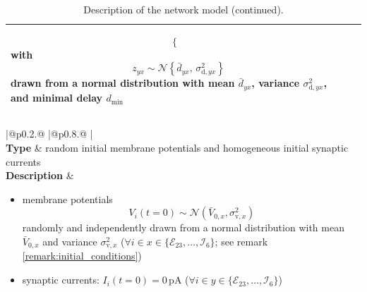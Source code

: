 \documentclass[10pt,a4paper,twoside,american]{article}
\theoremstyle{definitionstyle}
\begin{document}
\begin{table}[H]
\begin{tabular}{
  |@{\hspace*{\marg}}p{}@{\hspace*{\marg}}
  |@{\hspace*{\marg}}p{}@{\hspace*{\marg}}
  |}
\begin{itemize}
\begin{equation}
\begin{cases}
      \end{cases}
  \end{equation}
  with
  \begin{equation}
      z_{yx} \sim\mathcal{N}\left\{\bar{d}_{yx},\,\sigma_{\text{d},yx}^2\right\}
  \end{equation}
  drawn from a normal distribution with mean $\bar{d}_{yx}$, variance $\sigma_{\text{d},yx}^2$, and minimal delay $d_\text{min}$
  \end{itemize}\\
  \hline
\end{tabular}
\begin{tabular}{
  |@{\hspace*{\marg}}p{}@{\hspace*{\marg}}
  |@{\hspace*{\marg}}p{}@{\hspace*{\marg}}
  |}
  \hline
  \\
\hline
\textbf{Type} & random initial membrane potentials and homogeneous initial synaptic currents\\
\hline
  \textbf{Description} &
  \begin{itemize}
  \item membrane potentials
    \begin{equation}
      V_i(t=0)\sim\mathcal{N}(\bar{V}_{0,x},\sigma_{\text{v},x}^2)
    \end{equation}
  randomly and independently drawn from a normal distribution with mean $\bar{V}_{0,x}$ and variance $\sigma^2_{\text{v},x}$ ($\forall i \in x\in\{\mathcal{E}_{23},\ldots,\mathcal{I}_{6}\}$; see remark \ref{remark:initial_conditions})
  \item synaptic currents: $I_{i}(t=0)=0\,\text{pA}$ ($\forall i \in y\in\{\mathcal{E}_{23},\ldots,\mathcal{I}_{6}\}$)
  \end{itemize}\\
  \hline
\end{tabular}
\caption{Description of the network model (continued).}
\end{table}
\clearpage
\end{document}
